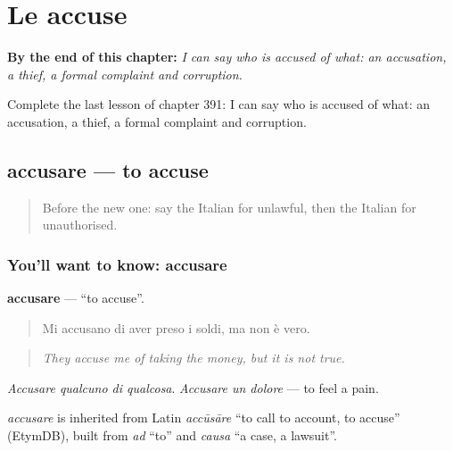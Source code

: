 
\chapter{Le accuse}
\label{ch:it-le-accuse}

\begin{chapteropening}
\textbf{By the end of this chapter:} \emph{I can say who is accused of what: an accusation, a thief, a formal complaint and corruption.}

Complete the last lesson of chapter 391: I can say who is accused of what: an accusation, a thief, a formal complaint and corruption.
\end{chapteropening}

\section[accusare]{accusare — to accuse}

\label{lesson:IT-C391-accusare}



\begin{quote}
Before the new one: say the Italian for unlawful, then the Italian for unauthorised.
\end{quote}

\subsection*{You'll want to know: accusare}
\textbf{accusare} — \textquotedblleft{}to accuse\textquotedblright{}.

\begin{quote}
Mi accusano di aver preso i soldi, ma non è vero.
\end{quote}

\begin{quote}
\emph{They accuse me of taking the money, but it is not true.}
\end{quote}

\emph{Accusare qualcuno di qualcosa}. \emph{Accusare un dolore} — to feel a pain.

\begin{cousinweb}
\emph{accusare} is inherited from Latin \emph{accūsāre} \textquotedblleft{}to call to account, to accuse\textquotedblright{} (EtymDB), built from \emph{ad} \textquotedblleft{}to\textquotedblright{} and \emph{causa} \textquotedblleft{}a case, a lawsuit\textquotedblright{}.
\end{cousinweb}

